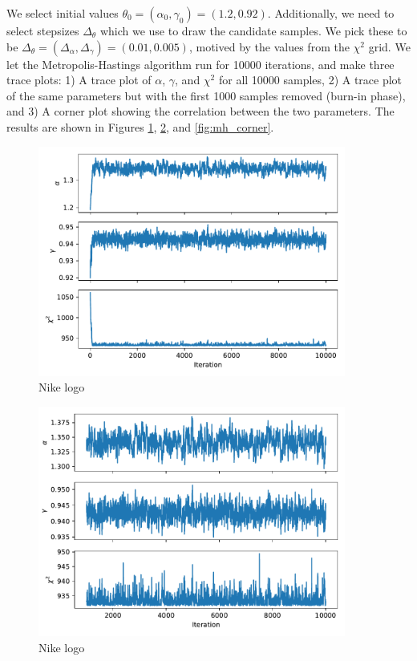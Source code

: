 \documentclass{article}
\begin{document}
We select initial values $\theta_0 = (\alpha_0, \gamma_0) = (1.2, 0.92)$. Additionally, we need to select stepsizes $\Delta_\theta$ which we use to draw the candidate samples. We pick these to be $\Delta_\theta = (\Delta_\alpha, \Delta_\gamma) = (0.01, 0.005)$, motived by the values from the $\chi^2$ grid. We let the Metropolis-Hastings algorithm run for 10000 iterations, and make three trace plots: 1) A trace plot of $\alpha$, $\gamma$, and $\chi^2$ for all 10000 samples, 2) A trace plot of the same parameters but with the first 1000 samples removed (burn-in phase), and 3) A corner plot showing the correlation between the two parameters. The results are shown in Figures \ref{fig:mh}, \ref{fig:mh_burnin}, and \ref{fig:mh_corner}.
\begin{figure}
    \centering
    \includegraphics[width=0.9\textwidth]{figs/mh.pdf}
    \caption{Nike logo}
    \label{fig:mh}
\end{figure}
\begin{figure}
    \centering
    \includegraphics[width=0.9\textwidth]{figs/mh_postburnin.pdf}
    \caption{Nike logo}
    \label{fig:mh_burnin}
\end{figure}
\end{document}
